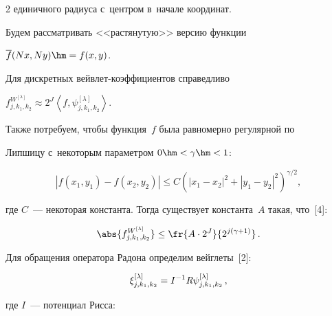 \begin{multicols}{2}
единичного радиуса с~центром в~начале координат.


Будем рассматривать <<растянутую>> версию функции


$ \overline{f} (Nx,Ny) \hm= f(x,y)$.


Для дискретных вейв\-лет-ко\-эф\-фи\-ци\-ен\-тов справедливо


$f_{j,k_1,k_2}^{W^{[\lambda]}} \approx 2^{J} \left\langle f,


\psi^{[\lambda]}_{j,k_1,k_2} \right\rangle$.


Также потребуем, чтобы функция~$f$ была равномерно регулярной по


Липшицу с~некоторым параметром $0\hm<\gamma\hm<1$:





\noindent


\begin{equation*}


\left\vert f(x_1,y_1) - f(x_2,y_2)\right\vert


\leq C\!\left(\!\left\vert x_1 - x_2\right\vert^2\! + \!


\left\vert y_1 - y_2\right\vert^2\right)^{\!\gamma/2}\!\!,


\end{equation*}


где $C$~--- некоторая константа. Тогда существует константа~$A$ такая, что~[4]:





\noindent


\begin{align}


\label{Coeff_Decay}


\abs{f_{j,k_1,k_2}^{W^{[\lambda]}}} \leq \fr{A \cdot 2^{J}}{2^{j(\gamma+1)}}\,.


\end{align}





Для обращения оператора Радона определим вейглеты~[2]:


\begin{equation}


\xi_{j,k_1,k_2}^{[\lambda]} = I^{-1}\Radon\psi_{j,k_1,k_2}^{[\lambda]}\,,


\label{Radon_vaguelette}


\end{equation}


где $I$~--- потенциал Рисса:



\end{multicols}

